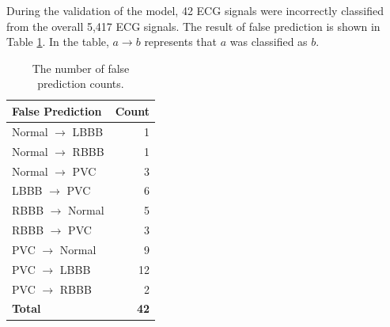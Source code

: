During the validation of the model, 42 ECG signals were incorrectly classified from the overall 5,417 ECG signals. The result of false prediction is shown in Table \ref{tab:false_pred_count}. In the table, $a \rightarrow b$ represents that $a$ was classified as $b$.


\renewcommand{\arraystretch}{2}
\begin{table}
	\caption{The number of false prediction counts.} \label{tab:false_pred_count}
	
	\begin{center}
		\begin{tabular}{ | l | r | }
			\hline
			\textbf{False Prediction} & \textbf{Count} \\ \hline
			Normal $\rightarrow$ LBBB  & 1   \\ \hline
			Normal $\rightarrow$ RBBB  & 1  \\ \hline
			Normal $\rightarrow$ PVC  & 3  \\ \hline
			LBBB $\rightarrow$ PVC  & 6  \\ \hline
			RBBB $\rightarrow$ Normal  & 5  \\ \hline
			RBBB $\rightarrow$ PVC  & 3  \\ \hline
			PVC $\rightarrow$ Normal  & 9  \\ \hline
			PVC $\rightarrow$ LBBB  & 12 \\ \hline
			PVC $\rightarrow$ RBBB  & 2  \\ \hline
			\textbf{Total}   & \textbf{42}  \\ \hline
		\end{tabular}
	\end{center}
	
\end{table}
